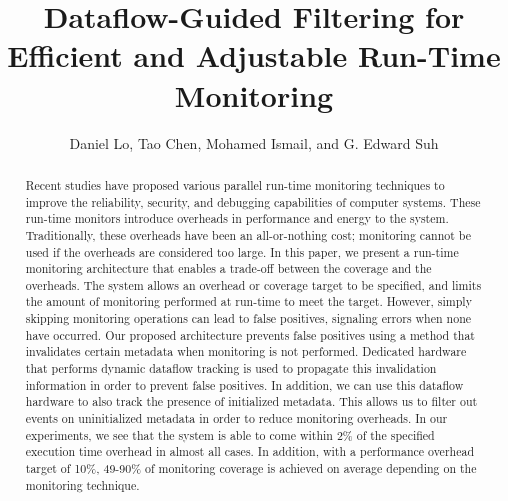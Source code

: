\title{
Dataflow-Guided Filtering for Efficient and Adjustable Run-Time Monitoring
}

{\author{Daniel Lo, Tao Chen, Mohamed Ismail, and G. Edward Suh}}

\date{}
\maketitle

\thispagestyle{empty}

\begin{abstract}

Recent studies have proposed various parallel run-time monitoring techniques to
improve the reliability, security, and debugging capabilities of
computer systems. These run-time monitors introduce overheads in performance
and energy to the system. Traditionally, these overheads have been an
all-or-nothing cost; monitoring cannot be used if the overheads are considered too large.
In this paper, we present a run-time monitoring architecture that
enables a trade-off between the coverage and the overheads.
The system allows an overhead or coverage target to be specified,
and limits the amount of monitoring performed at run-time to meet the target. 
However, simply skipping monitoring operations can lead to false
positives, signaling errors when none have occurred. Our proposed architecture
prevents false positives using a method that invalidates certain metadata
when monitoring is not performed. Dedicated hardware that performs dynamic
dataflow tracking is used to propagate this invalidation
information in order to prevent false positives. In addition, we can use this
dataflow hardware to also track the presence of initialized metadata. This
allows us to filter out events on uninitialized metadata in order to reduce
monitoring overheads.
In our experiments, we see that the system is able to come within 2\% of the
specified execution time overhead in almost all cases.  In addition, with a
performance overhead target of 10\%, 49-90\% of monitoring coverage is achieved
on average depending on the monitoring technique.

\end{abstract}
